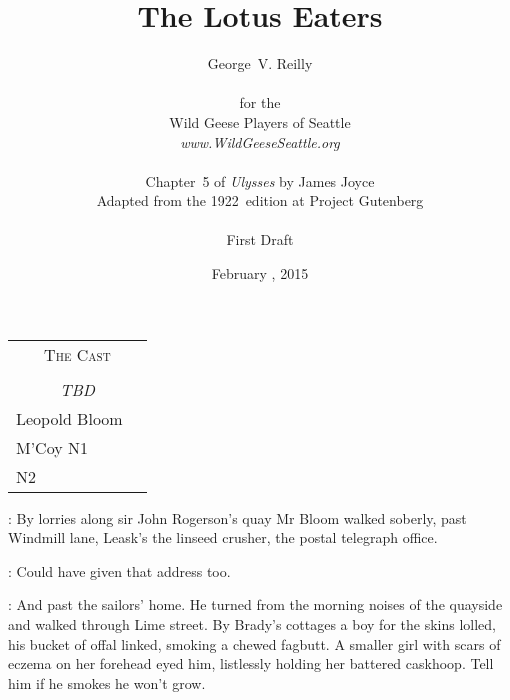 



\title{\Huge The Lotus Eaters}
\author{George~V. Reilly\\
\\
{\small for the}\\
Wild Geese Players of Seattle\\
{\emph{www.WildGeeseSeattle.org}}\\
\\
{\small Chapter~5 of \emph{Ulysses} by James Joyce}\\
{\small Adapted from the 1922~edition at Project Gutenberg}
\\
\\
{\small First Draft}}
\date{February , 2015}
\raggedbottom



\maketitle
\thispagestyle{empty}
\pagebreak

\begin{tabular}{lp{10cm}}
    \multicolumn{2}{c}{\Large \textsc{The Cast}} \\
\\
    \multicolumn{2}{c}{\large \textit{TBD}} \\
Leopold Bloom \\
M'Coy
N1 \\
N2 \\
\end{tabular}

\thispagestyle{empty}
\newpage


\setcounter{page}{1}

:
By lorries along sir John Rogerson's quay
Mr Bloom walked soberly,
past Windmill lane,
Leask's the linseed crusher,
the postal telegraph office.

\BloomInt:
Could have given that address too.

:
And past the sailors' home.
He turned from the morning noises of the quayside
and walked through Lime street.
By Brady's cottages
a boy for the skins lolled,
his bucket of offal linked,
smoking a chewed fagbutt.
A smaller girl with scars of eczema on her forehead
eyed him,
listlessly holding her battered caskhoop.
Tell him if he smokes he won't grow.

